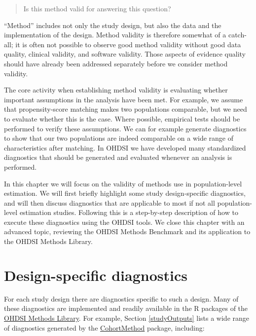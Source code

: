 \documentclass[11pt]{book}
\theoremstyle{definition}
\theoremstyle{definition}
\theoremstyle{definition}
\theoremstyle{remark}
\begin{document}
\begin{quote}
Is this method valid for answering this question?
\end{quote}

``Method'' includes not only the study design, but also the data and the implementation of the design. Method validity is therefore somewhat of a catch-all; it is often not possible to observe good method validity without good data quality, clinical validity, and software validity. Those aspects of evidence quality should have already been addressed separately before we consider method validity.

The core activity when establishing method validity is evaluating whether important assumptions in the analysis have been met. For example, we assume that propensity-score matching makes two populations comparable, but we need to evaluate whether this is the case. Where possible, empirical tests should be performed to verify these assumptions. We can for example generate diagnostics to show that our two populations are indeed comparable on a wide range of characteristics after matching. In OHDSI we have developed many standardized diagnostics that should be generated and evaluated whenever an analysis is performed.

In this chapter we will focus on the validity of methods use in population-level estimation. We will first briefly highlight some study design-specific diagnostics, and will then discuss diagnostics that are applicable to most if not all population-level estimation studies. Following this is a step-by-step description of how to execute these diagnostics using the OHDSI tools. We close this chapter with an advanced topic, reviewing the OHDSI Methods Benchmark and its application to the OHDSI Methods Library.

\hypertarget{design-specific-diagnostics}{%
\section{Design-specific diagnostics}\label{design-specific-diagnostics}}

For each study design there are diagnostics specific to such a design. Many of these diagnostics are implemented and readily available in the R packages of the \href{https://ohdsi.github.io/MethodsLibrary/}{OHDSI Methods Library}. For example, Section \ref{studyOutputs} lists a wide range of diagnostics generated by the \href{https://ohdsi.github.io/CohortMethod/}{CohortMethod} package, including:
\end{document}
